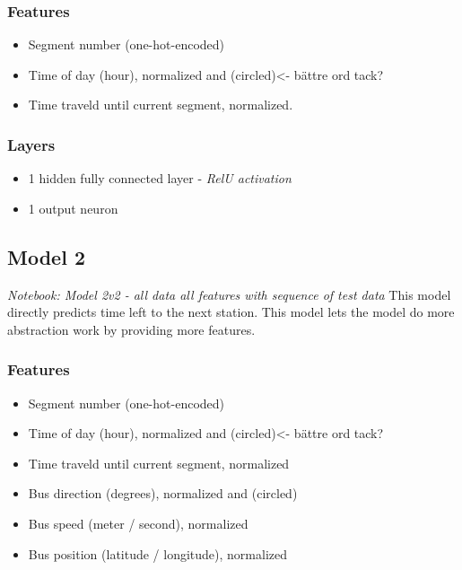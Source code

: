 \subsubsection{Features}

\begin{itemize}
    \item Segment number (one-hot-encoded)
    \item Time of day (hour), normalized and (circled)<- bättre ord tack?
    \item Time traveld until current segment, normalized.    
\end{itemize}

\subsubsection{Layers}

\begin{itemize}
    \item 1 hidden fully connected layer - \textit{RelU activation}
    \item 1 output neuron
\end{itemize}


\subsection{Model 2}\label{M2}
\textit{Notebook: Model 2v2 - all data all features with sequence of test data}
\noindent This model directly predicts time left to the next station. This model lets the model do more abstraction work by providing more features. 

\subsubsection{Features}

\begin{itemize}
    \item Segment number (one-hot-encoded)
    \item Time of day (hour), normalized and (circled)<- bättre ord tack?
    \item Time traveld until current segment, normalized
    \item Bus direction (degrees), normalized and (circled)
    \item Bus speed (meter / second), normalized
    \item Bus position (latitude / longitude), normalized
\end{itemize}
  
